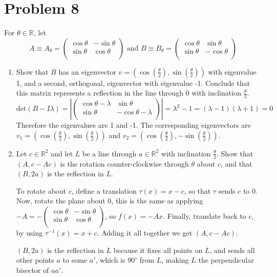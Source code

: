 \documentclass[a4paper,12pt]{extarticle}
\theoremstyle{definition}
\newcommand{\R}{\mathbb{R}} \newcommand{\Q}{\mathbb{Q}} \newcommand{\Z}{\mathbb{Z}} \newcommand{\N}{\mathbb{N}} \newcommand{\myskip}{\par\null\par} \renewcommand\qedsymbol{QED} \renewcommand{\leq}{\leqslant}\renewcommand{\geq}{\geqslant}
\begin{document}
            \section*{Problem 8}
            For $\theta\in\R$, let $$A\equiv A_{\theta}=\begin{pmatrix}
            \cos\theta & -\sin\theta\\
            \sin\theta & \cos\theta\\
            \end{pmatrix}\text{ and }B\equiv B_{\theta}=\begin{pmatrix}
            \cos\theta & \sin\theta\\
            \sin\theta & -\cos\theta\\
            \end{pmatrix}$$
            \begin{enumerate}[label=(\alph*)]
                \item Show that $B$ has an eigenvector $v=(\cos(\frac{\theta}{2}),\sin(\frac{\theta}{2}))$ with eigenvalue 1, and a second, orthogonal, eigenvector with eigenvalue -1. Conclude that this matrix represents a reflection in the line through 0 with inclination $\frac{\theta}{2}$.$$\text{det}(B-I\lambda)=\left|\begin{pmatrix}
            \cos\theta-\lambda & \sin\theta\\
            \sin\theta & -\cos\theta-\lambda\\
            \end{pmatrix}\right|=\lambda^2-1=(\lambda-1)(\lambda+1)=0$$ Therefore the eigenvalues are 1 and -1. The corresponding eigenvectors are $v_1=(\cos(\frac{\theta}{2}),\sin(\frac{\theta}{2}))$ and $v_2=(\cos(\frac{\theta}{2}),-\sin(\frac{\theta}{2}))$.
            \item Let $c\in\R^2$ and let $L$ be a line through $a\in\R^2$ with inclination $\frac{\theta}{2}$. Show that $(A,c-Ac)$ is the rotation counter-clockwise through $\theta$ about $c$, and that $(B,2a)$ is the reflection in $L$.\myskip To rotate about $c$, define a translation $\tau(x)=x-c$, so that $\tau$ sends $c$ to $0$. Now, rotate the plane about $0$, this is the same as applying $-A=-\begin{pmatrix}
            \cos\theta & -\sin\theta\\
            \sin\theta & \cos\theta\\
            \end{pmatrix}$, so $f(x)=-Ax$. Finally, translate back to $c$, by using $\tau^{-1}(x)=x+c$. Adding it all together we get $(A,c-Ac)$.\myskip $(B,2a)$ is the reflection in $L$ because it fixes all points on $L$, and sends all other points $a$ to some $a'$, which is $90^{\circ}$ from $L$, making $L$ the perpendicular bisector of $aa'$.
            \end{enumerate}
\end{document}
